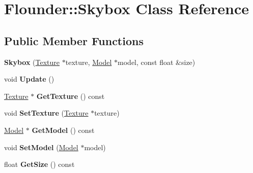 \hypertarget{class_flounder_1_1_skybox}{}\section{Flounder\+:\+:Skybox Class Reference}
\label{class_flounder_1_1_skybox}
\subsection*{Public Member Functions}
\begin{DoxyCompactItemize}
\item 
\mbox{\label{class_flounder_1_1_skybox_ae75e063db9dec7325898e5760f62a30d}} 
{\bfseries Skybox} (\hyperlink{class_flounder_1_1_texture}{Texture} $\ast$texture, \hyperlink{class_flounder_1_1_model}{Model} $\ast$model, const float \&size)
\item 
\mbox{\label{class_flounder_1_1_skybox_a05da4d9829e189915b716dc1decab270}} 
void {\bfseries Update} ()
\item 
\mbox{\label{class_flounder_1_1_skybox_afeaf57c44babc0f7f25731fc5eb230f2}} 
\hyperlink{class_flounder_1_1_texture}{Texture} $\ast$ {\bfseries Get\+Texture} () const
\item 
\mbox{\label{class_flounder_1_1_skybox_a9731465f27a2fa3466a5d3f5677a6a59}} 
void {\bfseries Set\+Texture} (\hyperlink{class_flounder_1_1_texture}{Texture} $\ast$texture)
\item 
\mbox{\label{class_flounder_1_1_skybox_a495f0e514a86dc3efea46d7b2f1a3e6c}} 
\hyperlink{class_flounder_1_1_model}{Model} $\ast$ {\bfseries Get\+Model} () const
\item 
\mbox{\label{class_flounder_1_1_skybox_a5c02c16ae8b0cc73474865adb574507b}} 
void {\bfseries Set\+Model} (\hyperlink{class_flounder_1_1_model}{Model} $\ast$model)
\item 
\mbox{\label{class_flounder_1_1_skybox_a5e5539a0af221fea6445f8b4925b78dd}} 
float {\bfseries Get\+Size} () const
\item 
\mbox{\label{class_flounder_1_1_skybox_a702aa51321cd811143c9248af3c81a99}} 

\end{DoxyCompactItemize}
